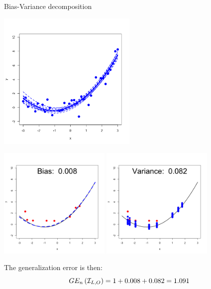 \documentclass[11pt,compress,t,notes=noshow, xcolor=table]{beamer}
\begin{document}
\begin{vbframe} {Bias-Variance decomposition}
\begin{center}
  \includegraphics[width = 0.5\textwidth]{figure/bias_variance_decomposition-correct_model.png}
\end{center}

\framebreak

\begin{center}
  \includegraphics[width = 0.4\textwidth]{figure/bias_variance_decomposition-correct_model_bias.png}
  \includegraphics[width = 0.4\textwidth]{figure/bias_variance_decomposition-correct_model_variance.png}
\end{center}


The generalization error is then: 
$$GE_n\left(\mathcal{I}_{L, O}\right) = 1 + 0.008 + 0.082 = 1.091 $$

\end{vbframe}
\end{document}
